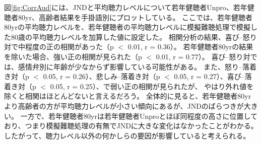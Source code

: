 図\ref{fig:CorrAud}には、JNDと平均聴力レベルについて若年健聴者Unpro、若年健聴者80yr、高齢者結果を手掛語別にプロットしている。
ここでは、若年健聴者80yrの平均聴力レベルを、若年健聴者の平均聴力レベルに模擬難聴処理で模擬した80歳の平均聴力レベル\cite{tsuiki2002nihon}を加算した値に設定した。
相関分析の結果、喜び--怒り対で中程度の正の相関があった（p $<$ 0.01, r = 0.36）。
若年健聴者80yrの結果を除いた場合、強い正の相関が見られた（p $<$ 0.01, r = 0.77）。
喜び--怒り対では、感情弁別に年齢が少なからず影響している可能性がある。
また、怒り--落着き対（p $<$ 0.05, r = 0.26）、悲しみ--落着き対（p $<$ 0.05, r = 0.27）、喜び--落着き対（p $<$ 0.05, r = 0.25）、で弱い正の相関が見られたが、
やはり外れ値を除くと相関はほとんどないと言えるだろう。
全体的に見ると、若年健聴者80yrより高齢者の方が平均聴力レベルが小さい傾向にあるが、JNDのばらつきが大きい。
一方で、若年健聴者80yrは若年健聴者Unproとほぼ同程度の高さに位置しており、つまり模擬難聴処理の有無でJNDに大きな変化はなかったことがわかる。
したがって、聴力レベル以外の何かしらの要因が影響していると考えられる。




